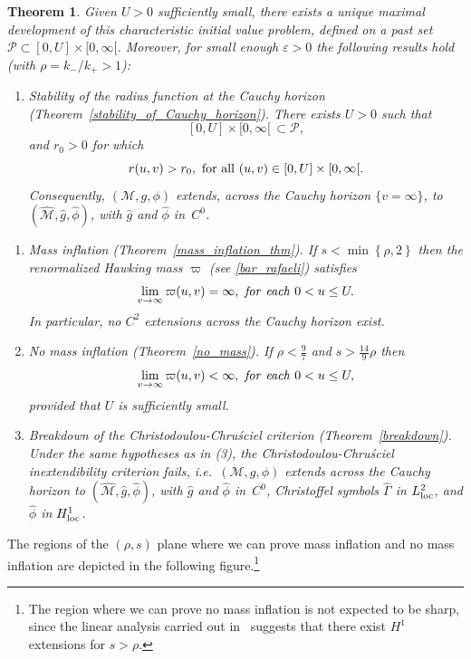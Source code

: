 \documentclass[a4paper,11pt,oneside,reqno]{amsart}
\newcommand{\s}{s}
\newtheorem{Thm}{Theorem}[section]
\newcommand{\cal}{\mathcal}
\begin{document}
\begin{Thm}
Given $U > 0$ sufficiently small, there exists a unique maximal development of this characteristic initial value problem, defined on a past set ${\cal P} \subset [0,U] \times [0,\infty[$.
Moreover, for small enough $\varepsilon>0$ the following results hold (with $\rho=k_-/k_+>1$):
\begin{enumerate}[{\rm (1)}]
\item  {\em Stability of the radius function at the Cauchy horizon (Theorem~\ref{stability_of_Cauchy_horizon}).} There exists $U>0$ such that
$$[0,U]\times[0,\infty[\,\subset {\cal P},$$
and $r_0>0$ for which
$$r(u,v)>r_0,\ {\rm for\ all}\ (u,v)\in[0,U]\times[0,\infty[.$$
Consequently, $({\cal M},g,\phi)$ extends, across the Cauchy horizon $\{v=\infty\}$, to $(\hat {\cal M},\hat g,\hat \phi)$, with $\hat g$ and $\hat \phi$ in~$C^0$.
\end{enumerate}
\begin{enumerate}[{\rm (1)}]\addtocounter{enumi}{+1}
\item {\em Mass inflation (Theorem~\ref{mass_inflation_thm}).} If $\s<\min\left\{\rho,2\right\}$ then the renormalized Hawking mass $\varpi$ (see \eqref{bar_rafaeli}) satisfies
\begin{equation*}
\lim_{v\rightarrow\infty}\varpi(u,v)=\infty,\ {\it for\ each}\/\  0<u\leq U.
\end{equation*}
In particular, no $C^2$ extensions across the Cauchy horizon exist.
\item {\em No mass inflation (Theorem~\ref{no_mass}).}  If $\rho<\frac{9}{7}$ and $s>\frac{14}{9} \rho$ then
\[
\lim_{v\rightarrow\infty}\varpi(u,v)<\infty,\ {\it for\ each}\/\  0<u\leq U,
\]
provided that $U$ is sufficiently small.
\item {\em Breakdown of the Christodoulou-Chru\'sciel criterion (Theorem~\ref{breakdown}).} 
Under the same hypotheses as in {\rm (3)}, the Christodoulou-Chru\'sciel inextendibility criterion fails, i.e.\ 
$({\cal M},g,\phi)$ extends across the Cauchy horizon to $(\hat {\cal M},\hat g,\hat \phi)$, with $\hat g$ and $\hat \phi$ in~$C^0$,
Christoffel symbols $\hat\Gamma$ in $L^2_{\rm loc}$, and $\hat\phi$ in $H^1_{\rm loc}$.
\end{enumerate}
\end{Thm}
The regions of the $(\rho,s)$ plane where we can prove mass inflation and no mass inflation are depicted in the following figure.\footnote{The region where we can prove no mass inflation is not expected to be sharp, since the linear analysis carried out in~\cite{CostaFranzen, peter2} suggests that there exist $H^1$ extensions for $s>\rho$.}
\end{document}
